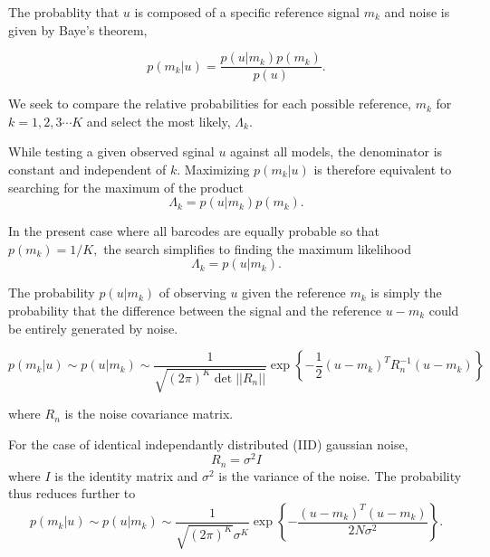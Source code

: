 The probablity that $u$ is composed of a specific reference signal $m_k$ and noise is given by Baye's theorem,

\begin{equation}\label{eq:Bayes}
p(m_k|u) = \frac{p(u|m_k)p(m_k)} {p(u)}.
\end{equation}

We seek to compare the relative probabilities for each possible reference, $m_k$ for $k=1,2,3 \cdots K$ and select the most likely, $\Lambda_k$. 

While testing a given observed sginal $u$ against all models, the denominator is constant and independent of $k$. Maximizing $p(m_k|u)$ is therefore equivalent to searching for the maximum of the product
\begin{equation}
\Lambda_k = p(u|m_k)p(m_k).
\end{equation}

In the present case where all barcodes are equally probable so that
$p(m_k)=1/K,$ 
the search simplifies to finding the maximum likelihood 
\begin{equation}
\Lambda_k = p(u|m_k).
\end{equation}

The probability $p(u|m_k)$ of observing $u$ given the reference $m_k$  is simply the probability that the difference between the signal and the reference $u-m_k$ could be entirely generated by noise.

\begin{equation}
p(m_k|u)\sim p(u|m_k) \sim \frac{1}{  \sqrt{ (2\pi)^K \det || R_n||} } \exp\left\{ -\frac{1}{2}  (u-m_k)^T R_n^{-1} (u-m_k) \right\}
\end{equation}

where $R_n$ is the noise covariance matrix. 

For the case of identical independantly distributed (IID) gaussian noise, 
\begin{equation}
R_n=\sigma^2 I
\end{equation}
where $I$ is the identity matrix and $\sigma^2$ is the variance of the noise. The probability thus reduces further to
\begin{equation}\label{eq:iidEnergy}
p(m_k|u)\sim p(u|m_k) \sim \frac{1}{  \sqrt{ (2\pi)^K} \sigma^K  } \exp\left\{ -\frac{(u-m_k)^T(u-m_k)} {2 N \sigma^2 } \right\}.
\end{equation}

